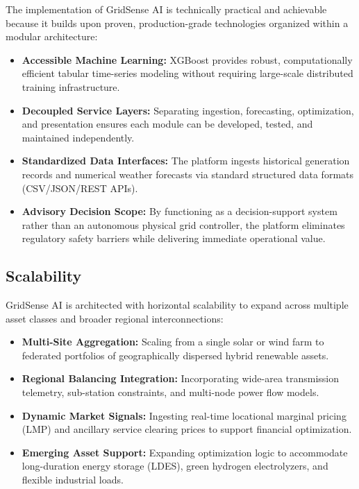 The implementation of GridSense AI is technically practical and achievable because it builds upon proven, production-grade technologies organized within a modular architecture:
\begin{itemize}[leftmargin=1.8em, itemsep=0.2em]
    \item \textbf{Accessible Machine Learning:} XGBoost provides robust, computationally efficient tabular time-series modeling without requiring large-scale distributed training infrastructure.
    \item \textbf{Decoupled Service Layers:} Separating ingestion, forecasting, optimization, and presentation ensures each module can be developed, tested, and maintained independently.
    \item \textbf{Standardized Data Interfaces:} The platform ingests historical generation records and numerical weather forecasts via standard structured data formats (CSV/JSON/REST APIs).
    \item \textbf{Advisory Decision Scope:} By functioning as a decision-support system rather than an autonomous physical grid controller, the platform eliminates regulatory safety barriers while delivering immediate operational value.
\end{itemize}

\subsection{Scalability}
\label{subsec:scalability}

GridSense AI is architected with horizontal scalability to expand across multiple asset classes and broader regional interconnections:
\begin{itemize}[leftmargin=1.8em, itemsep=0.2em]
    \item \textbf{Multi-Site Aggregation:} Scaling from a single solar or wind farm to federated portfolios of geographically dispersed hybrid renewable assets.
    \item \textbf{Regional Balancing Integration:} Incorporating wide-area transmission telemetry, sub-station constraints, and multi-node power flow models.
    \item \textbf{Dynamic Market Signals:} Ingesting real-time locational marginal pricing (LMP) and ancillary service clearing prices to support financial optimization.
    \item \textbf{Emerging Asset Support:} Expanding optimization logic to accommodate long-duration energy storage (LDES), green hydrogen electrolyzers, and flexible industrial loads.
\end{itemize}


